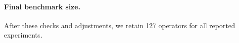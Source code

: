 \documentclass{article}
\theoremstyle{plain}
\theoremstyle{definition}
\theoremstyle{remark}
\begin{document}

\paragraph{Final benchmark size.}
After these checks and adjustments, we retain 127 operators for all reported experiments.
\end{document}
